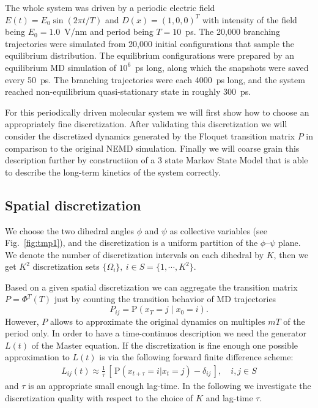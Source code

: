 \documentclass[aps, pre, preprint,unsortedaddress,a4paper,onecolumn]{revtex4}
\newcommand{\redc}[1]{{\color{red} #1}}
\newcommand{\vect}[1]{#1}
\newcommand{\myphi}{\Phi}
\newcommand{\prob}{\textrm{P}}
\begin{document}
The whole system was driven by a periodic electric field
$E(t) = E_0\sin(2\pi t/T)$ and $D(x) = (1,0,0)^T$
with intensity of the field being $E_0 = 1.0$~V/nm and period being
$T = 10$~ps.
The 20,000 branching trajectories were simulated from 20,000
initial configurations that sample the equilibrium distribution.
The equilibrium configurations were prepared by an equilibrium MD simulation
of $10^6$~ps long, along which the snapshots were saved every 50~ps.
The branching
trajectories were each 4000~ps long, and the system reached
non-equilibrium quasi-stationary state in roughly 300~ps.


For this periodically driven molecular system we will first show how to choose an appropriately fine discretization. After validating this discretization we will consider
the discretized dynamics generated by the Floquet transition matrix $\vect P$
in comparison to the original NEMD simulation. Finally we will coarse grain this description further by constructiion of a $3$ state Markov State Model that is able to describe the long-term kinetics of the system correctly. 

\subsection{Spatial discretization}

We choose the
two dihedral angles $\phi$ and $\psi$ as collective variables (see
Fig.~\ref{fig:tmp1}), and the discretization is a uniform partition of
the $\phi$--$\psi$ plane. We denote the number of discretization intervals on each
dihedral by $K$, then we get $K^2$ discretization sets 
$\{\Omega_i\},\ i\in S = \{1,\cdots,K^2\}$.

Based on a given spatial discretization we can aggregate the transition matrix $\vect P=\myphi^T(T)$ just by counting the transition behavior of MD trajectories 
\[
\vect P_{ij}=\prob\left(\vect x_T=j\mid \vect x_0=i \right).
\]
However, $\vect P$ allows to approximate the original dynamics on multiples $mT$ of the period only. In order to have a time-continuos description we need the generator $L(t)$ of the Master equation. 
If the discretization is fine enough one possible approximation to $L(t)$ is via
the following forward finite difference scheme:
\begin{align}
  \label{eqn:tmp4}
  L_{ij}(t) \approx \frac{1}{\tau}
  \,[\, \prob (\vect x_{t+\tau} = i \vert \vect x_{t} = j) - \delta_{ij} \,],
  \quad i,j\in S
\end{align}
and $\tau$ is an appropriate small enough lag-time.
In the following 
we investigate the discretization
quality with respect to  the choice of $K$ and  lag-time $\tau$.
\end{document}
